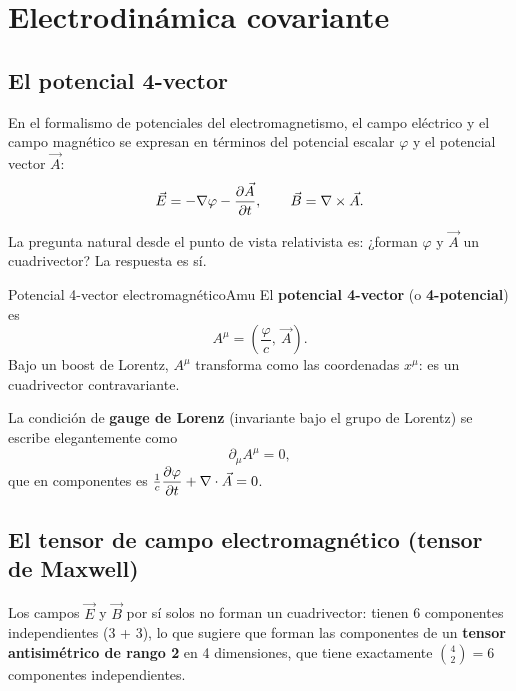 \section{Electrodinámica covariante}
\label{sec:maxwell_cov}

\subsection{El potencial 4-vector}

En el formalismo de potenciales del electromagnetismo, el campo eléctrico y el campo magnético se expresan en términos del potencial escalar $\varphi$ y el potencial vector $\vec{A}$:
\begin{equation}
  \vec{E} = -\nabla\varphi - \dfrac{\partial \vec{A}}{\partial t}, \qquad
  \vec{B} = \nabla\times\vec{A}.
  \label{eq:EBpotentials}
\end{equation}

La pregunta natural desde el punto de vista relativista es: ¿forman $\varphi$ y $\vec{A}$ un cuadrivector? La respuesta es sí.

\begin{definicion}{Potencial 4-vector electromagnético}{Amu}
El \textbf{potencial 4-vector} (o \textbf{4-potencial}) es
\begin{equation}
  A^\mu = \left(\frac{\varphi}{c},\ \vec{A}\right).
  \label{eq:Amu}
\end{equation}
Bajo un boost de Lorentz, $A^\mu$ transforma como las coordenadas $x^\mu$: es un cuadrivector contravariante.
\end{definicion}

La condición de \textbf{gauge de Lorenz} (invariante bajo el grupo de Lorentz) se escribe elegantemente como
\begin{equation}
  \partial_\mu A^\mu = 0,
  \label{eq:lorenz_gauge}
\end{equation}
que en componentes es $\frac{1}{c}\dfrac{\partial \varphi}{\partial t} + \nabla\cdot\vec{A} = 0$.

\subsection{El tensor de campo electromagnético (tensor de Maxwell)}

Los campos $\vec{E}$ y $\vec{B}$ por sí solos no forman un cuadrivector: tienen 6 componentes independientes (3 + 3), lo que sugiere que forman las componentes de un \textbf{tensor antisimétrico de rango 2} en 4 dimensiones, que tiene exactamente $\binom{4}{2} = 6$ componentes independientes.

